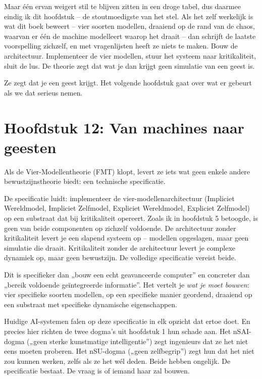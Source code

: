 \documentclass[11pt, twoside, openright]{book}
\begin{document}
Maar één ervan weigert stil te blijven zitten in een droge tabel, dus daarmee eindig ik dit hoofdstuk -- de stoutmoedigste van het stel. Als het zelf werkelijk is wat dit boek beweert -- vier soorten modellen, draaiend op de rand van de chaos, waarvan er één de machine modelleert waarop het draait -- dan schrijft de laatste voorspelling zichzelf, en met vragenlijsten heeft ze niets te maken. Bouw de architectuur. Implementeer de vier modellen, stuur het systeem naar kritikaliteit, sluit de lus. De theorie zegt dat wat je dan krijgt geen simulatie van een geest is.

Ze zegt dat je een geest krijgt. Het volgende hoofdstuk gaat over wat er gebeurt als we dat serieus nemen.


\chapter*{Hoofdstuk 12: Van machines naar geesten}

Als de Vier-Modellentheorie (FMT) klopt, levert ze iets wat geen enkele andere bewustzijnstheorie biedt: een technische specificatie.

De specificatie luidt: implementeer de vier-modellenarchitectuur (Impliciet Wereldmodel, Impliciet Zelfmodel, Expliciet Wereldmodel, Expliciet Zelfmodel) op een substraat dat bij kritikaliteit opereert. Zoals ik in hoofdstuk 5 betoogde, is geen van beide componenten op zichzelf voldoende. De architectuur zonder kritikaliteit levert je een slapend systeem op -- modellen opgeslagen, maar geen simulatie die draait. Kritikaliteit zonder de architectuur levert je complexe dynamiek op, maar geen bewustzijn. De volledige specificatie vereist beide.

Dit is specifieker dan „bouw een echt geavanceerde computer” en concreter dan „bereik voldoende geïntegreerde informatie”. Het vertelt je \textit{wat je moet bouwen}: vier specifieke soorten modellen, op een specifieke manier geordend, draaiend op een substraat met specifieke dynamische eigenschappen.

Huidige AI-systemen falen op deze specificatie in elk opzicht dat ertoe doet. En precies hier richten de twee dogma's uit hoofdstuk 1 hun schade aan. Het nSAI-dogma („geen sterke kunstmatige intelligentie”) zegt ingenieurs dat ze het niet eens moeten proberen. Het nSU-dogma („geen zelfbegrip”) zegt hun dat het niet zou kunnen werken, zelfs als ze het wél deden. Beide hebben ongelijk. De specificatie bestaat. De vraag is of iemand haar zal bouwen.
\end{document}
